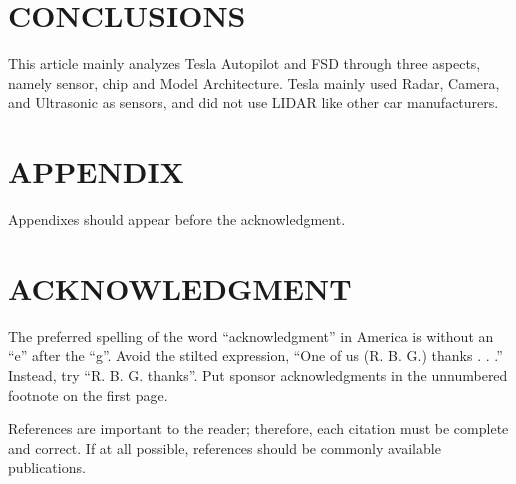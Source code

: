 \documentclass[letterpaper, 10 pt, conference]{ieeeconf}  %
\begin{document}
\section{CONCLUSIONS}
This article mainly analyzes Tesla Autopilot and FSD through three aspects, namely sensor, chip and Model Architecture. Tesla mainly used Radar, Camera, and Ultrasonic as sensors, and did not use LIDAR like other car manufacturers. 


\addtolength{\textheight}{-12cm}   %







\section*{APPENDIX}

Appendixes should appear before the acknowledgment.

\section*{ACKNOWLEDGMENT}

The preferred spelling of the word ``acknowledgment'' in America is without an ``e'' after the ``g''. Avoid the stilted expression, ``One of us (R. B. G.) thanks . . .''  Instead, try ``R. B. G. thanks''. Put sponsor acknowledgments in the unnumbered footnote on the first page.




References are important to the reader; therefore, each citation must be complete and correct. If at all possible, references should be commonly available publications.





\end{document}
